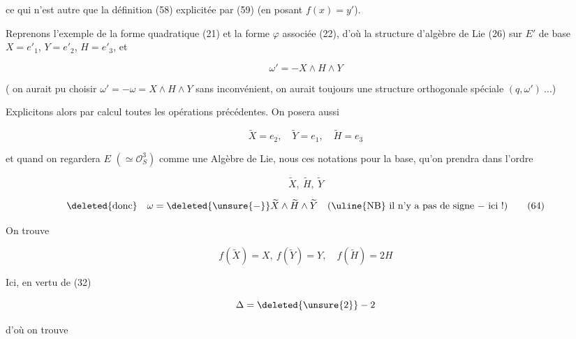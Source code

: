 ce qui n'est autre que la définition (58) explicitée par (59) (en posant $f(x)=y'$).




Reprenons l'exemple de la forme quadratique (21) et la forme $\varphi$ associée (22), d'où la structure d'algèbre de Lie (26) sur $E'$ de base $X=e'_1$, $Y=e'_2$, $H=e'_3$, et

\[
\omega'=-X\wedge H\wedge Y \tag*{(61)}
\]

( on aurait pu choisir  $\omega'=-\omega=X\wedge H\wedge Y$ sans inconvénient, on aurait toujours une structure orthogonale spéciale $(q,\omega')\ \ldots$)

Explicitons alors par calcul toutes les opérations précédentes. On posera aussi

\[
\widetilde X=e_2,\quad\widetilde Y=e_1,\quad\widetilde H=e_3 \tag*{(62)}
\]

 et quand on regardera $E$ $(\simeq\mathscr O_S^3)$ comme une Algèbre de Lie, nous  ces notations pour la base, qu'on prendra dans l'ordre

\[
\widetilde X,\ \widetilde H,\ \widetilde Y \tag*{(63)}
\]

\[
\text{\deleted{donc}}\quad\omega=\deleted{\unsure{-}}\widetilde X\wedge\widetilde H\wedge\widetilde Y
\quad\text{(\uline{NB} il n'y a pas de signe $-$ ici !)} \tag*{(64)}
\]

On trouve

\[
f(\widetilde X)=X,\ f(\widetilde Y)=Y,\quad f(\widetilde H)=2H \tag*{(65)}
\]

Ici, en vertu de (32)

\[
\Delta=\deleted{\unsure{2}}-2
\]

d'où on trouve

